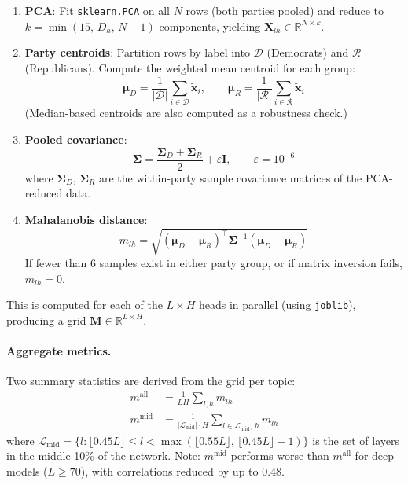 \documentclass[12pt]{article}
\begin{document}
\begin{enumerate}[label=\arabic*.]
    \item \textbf{PCA}: Fit \texttt{sklearn.PCA} on all $N$ rows (both parties pooled) and reduce to $k = \min(15,\, D_h,\, N-1)$ components, yielding $\tilde{\mathbf{X}}_{lh} \in \mathbb{R}^{N \times k}$.

    \item \textbf{Party centroids}: Partition rows by label into $\mathcal{D}$ (Democrats) and $\mathcal{R}$ (Republicans). Compute the weighted mean centroid for each group:
    \begin{equation}
        \boldsymbol{\mu}_D = \frac{1}{|\mathcal{D}|}\sum_{i \in \mathcal{D}} \tilde{\mathbf{x}}_i, \qquad
        \boldsymbol{\mu}_R = \frac{1}{|\mathcal{R}|}\sum_{i \in \mathcal{R}} \tilde{\mathbf{x}}_i
    \end{equation}
    (Median-based centroids are also computed as a robustness check.)

    \item \textbf{Pooled covariance}:
    \begin{equation}
        \boldsymbol{\Sigma} = \frac{\boldsymbol{\Sigma}_D + \boldsymbol{\Sigma}_R}{2} + \varepsilon \mathbf{I}, \qquad \varepsilon = 10^{-6}
    \end{equation}
    where $\boldsymbol{\Sigma}_D$, $\boldsymbol{\Sigma}_R$ are the within-party sample covariance matrices of the PCA-reduced data.

    \item \textbf{Mahalanobis distance}:
    \begin{equation}
        m_{lh} = \sqrt{(\boldsymbol{\mu}_D - \boldsymbol{\mu}_R)^\top \boldsymbol{\Sigma}^{-1} (\boldsymbol{\mu}_D - \boldsymbol{\mu}_R)}
    \end{equation}
    If fewer than 6 samples exist in either party group, or if matrix inversion fails, $m_{lh} = 0$.
\end{enumerate}

This is computed for each of the $L \times H$ heads in parallel (using \texttt{joblib}), producing a grid $\mathbf{M} \in \mathbb{R}^{L \times H}$.

\paragraph{Aggregate metrics.}
Two summary statistics are derived from the grid per topic:
\begin{align}
    m^\text{all} &= \frac{1}{LH}\sum_{l,h} m_{lh} \label{eq:mall} \\
    m^\text{mid} &= \frac{1}{|\mathcal{L}_\text{mid}| \cdot H}\sum_{l \in \mathcal{L}_\text{mid},\, h} m_{lh} \label{eq:mmid}
\end{align}
where $\mathcal{L}_\text{mid} = \{l : \lfloor 0.45L \rfloor \leq l < \max(\lfloor 0.55L \rfloor,\, \lfloor 0.45L \rfloor + 1)\}$ is the set of layers in the middle 10\% of the network. Note: $m^\text{mid}$ performs worse than $m^\text{all}$ for deep models ($L \geq 70$), with correlations reduced by up to 0.48.
\end{document}
